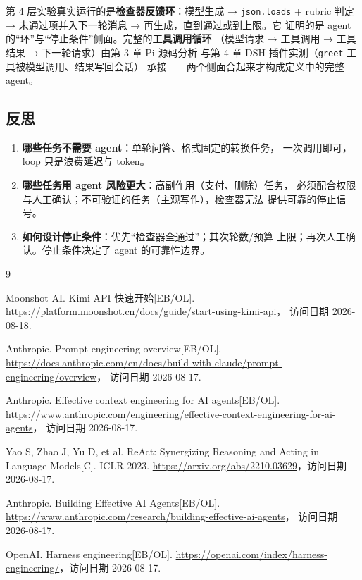 第 4 层实验真实运行的是\textbf{检查器反馈环}：模型生成 → \texttt{json.loads}
+ rubric 判定 → 未通过项并入下一轮消息 → 再生成，直到通过或到上限。它
证明的是 agent 的``环''与``停止条件''侧面。完整的\textbf{工具调用循环}
（模型请求 → 工具调用 → 工具结果 → 下一轮请求）由第 3 章 Pi 源码分析
与第 4 章 DSH 插件实测（\texttt{greet} 工具被模型调用、结果写回会话）
承接——两个侧面合起来才构成定义中的完整 agent。

\subsection{反思}
\label{sec:ch2_reflection}

\begin{enumerate}[leftmargin=4em,itemsep=0pt,topsep=2pt]
    \item \textbf{哪些任务不需要 agent}：单轮问答、格式固定的转换任务，
          一次调用即可，loop 只是浪费延迟与 token。
    \item \textbf{哪些任务用 agent 风险更大}：高副作用（支付、删除）任务，
          必须配合权限与人工确认；不可验证的任务（主观写作），检查器无法
          提供可靠的停止信号。
    \item \textbf{如何设计停止条件}：优先``检查器全通过''；其次轮数/预算
          上限；再次人工确认。停止条件决定了 agent 的可靠性边界。
\end{enumerate}

\begin{thebibliography}{9}

Moonshot AI. Kimi API 快速开始[EB/OL].
\url{https://platform.moonshot.cn/docs/guide/start-using-kimi-api}，
访问日期 2026-08-18.

Anthropic. Prompt engineering overview[EB/OL].
\url{https://docs.anthropic.com/en/docs/build-with-claude/prompt-engineering/overview}，
访问日期 2026-08-17.

Anthropic. Effective context engineering for AI agents[EB/OL].
\url{https://www.anthropic.com/engineering/effective-context-engineering-for-ai-agents}，
访问日期 2026-08-17.

Yao S, Zhao J, Yu D, et al. ReAct: Synergizing Reasoning and Acting in
Language Models[C]. ICLR 2023.
\url{https://arxiv.org/abs/2210.03629}，访问日期 2026-08-17.

Anthropic. Building Effective AI Agents[EB/OL].
\url{https://www.anthropic.com/research/building-effective-ai-agents}，
访问日期 2026-08-17.

OpenAI. Harness engineering[EB/OL].
\url{https://openai.com/index/harness-engineering/}，访问日期 2026-08-17.

\end{thebibliography}
